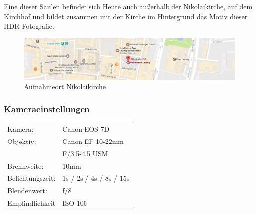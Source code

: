 \documentclass[liststotoc,bibtotoc,fontsize=14pt,]{scrreprt}
\begin{document}
\bigskip
Eine dieser Säulen befindet sich Heute auch außerhalb der Nikolaikirche, auf dem Kirchhof und bildet zusammen mit der Kirche im Hintergrund das Motiv dieser HDR-Fotografie.

\begin{figure}[H]
	\includegraphics[width=\linewidth]{img/places/nikolai_map.jpg}
	\caption{Aufnahmeort Nikolaikirche}
	\label{img:ak_map}
\end{figure}

\subsubsection{Kameraeinstellungen}
\begin{minipage}{0.58\textwidth}
	\begin{tabular}{ll}
		Kamera: &Canon EOS 7D \\
		Objektiv: &Canon EF 10-22mm \\
		& F/3.5-4.5 USM\\		
		Brennweite:&  10mm \\
		Belichtungszeit: & 1s / 2s / 4s / 8s / 15s \\
		Blendenwert: & f/8\\
		Empfindlichkeit & ISO 100\\
	\end{tabular}\\
\end{minipage}%
\begin{minipage}{0.42\textwidth}
	
\end{minipage}%
\end{document}
